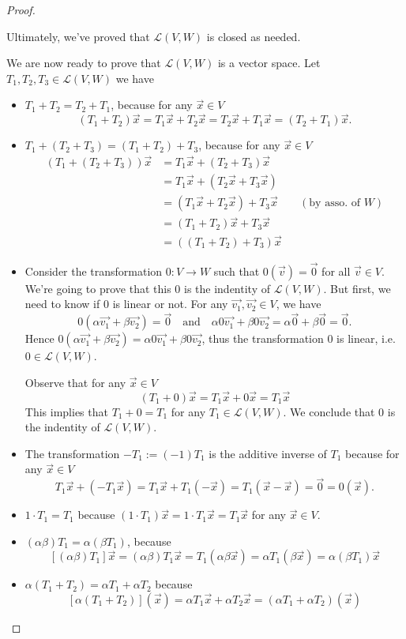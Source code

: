 \documentclass{article}
\begin{document}
\begin{proof}
\begin{itemize}
      Ultimately, we've proved that $\mathcal{L}(V,W)$ is closed as needed.
  \end{itemize}
  We are now ready to prove that $\mathcal{L}(V,W)$ is a vector space.
  Let $T_1,T_2,T_3\in\mathcal{L}(V,W)$ we have
  \begin{itemize}
    \item $T_1+T_2=T_2+T_1$, because for any $\vec{x}\in V$
      \[ (T_1+T_2)\vec{x}=T_1\vec{x}+T_2\vec{x}=T_2\vec{x}+T_1\vec{x}=(T_2+T_1)\vec{x}. \]
    \item $T_1+(T_2+T_3)=(T_1+T_2)+T_3$, because for any $\vec{x}\in V$
      \begin{align*}
        (T_1+(T_2+T_3))\vec{x}
        &=T_1\vec{x}+(T_2+T_3)\vec{x}\\
        &=T_1\vec{x}+(T_2\vec{x}+T_3\vec{x})\\
        &=(T_1\vec{x}+T_2\vec{x})+T_3\vec{x} && (\text{by asso. of $W$})\\
        &=(T_1+T_2)\vec{x}+T_3\vec{x}\\
        &=((T_1+T_2)+T_3)\vec{x}
      \end{align*}
    \item Consider the transformation $0:V\to W$ such that
      $0(\vec{v})=\vec{0}$ for all $\vec{v}\in V$. We're going to prove that
      this $0$ is the indentity of $\mathcal{L}(V,W)$. But first, we need to 
      know if $0$ is  linear or not. For any $\vec{v_1},\vec{v_2}\in V$, we have
      \[
        0(\alpha\vec{v_1}+\beta\vec{v_2})=\vec{0}
        \quad\text{and}\quad
        \alpha 0\vec{v_1}+\beta 0\vec{v_2}=\alpha\vec{0}+\beta\vec{0}=\vec{0}.
      \]
      Hence $0(\alpha\vec{v_1}+\beta\vec{v_2})=\alpha 0\vec{v_1}+\beta 0\vec{v_2}$,
      thus the transformation $0$ is linear, i.e. $0\in\mathcal{L}(V,W)$.

      Observe that for any $\vec{x}\in V$
      \[(T_1+0)\vec{x}=T_1\vec{x}+0\vec{x}=T_1\vec{x}\]
      This implies that $T_1+0=T_1$ for any $T_1\in\mathcal{L}(V,W)$.
      We conclude that $0$ is the indentity of $\mathcal{L}(V,W)$.
    \item The transformation $-T_1:=(-1)T_1$ is the additive inverse of $T_1$
      because for any $\vec{x}\in V$
      \[T_1\vec{x}+(-T_1\vec{x})=T_1\vec{x}+T_1(-\vec{x})=T_1(\vec{x}-\vec{x})=\vec{0}=0(\vec{x}).\]
    \item $1\cdot T_1=T_1$ because  $(1\cdot T_1)\vec{x}=1\cdot T_1\vec{x}=T_1\vec{x}$
      for any $\vec{x}\in V$.
    \item $(\alpha\beta)T_1=\alpha (\beta T_1)$, because 
      \[ 
        [(\alpha \beta)T_1]\vec{x}=(\alpha\beta)T_1\vec{x}=T_1(\alpha\beta\vec{x})
        =\alpha T_1(\beta\vec{x})=\alpha (\beta T_1)\vec{x}
      \]
    \item $\alpha (T_1+T_2)=\alpha T_1+\alpha T_2$ because
      \[
        [\alpha(T_1+T_2)](\vec{x})=\alpha T_1\vec{x}+\alpha T_2\vec{x}=(\alpha T_1+\alpha T_2)(\vec{x})
      \]
  \end{itemize}
\end{proof}
\end{document}
